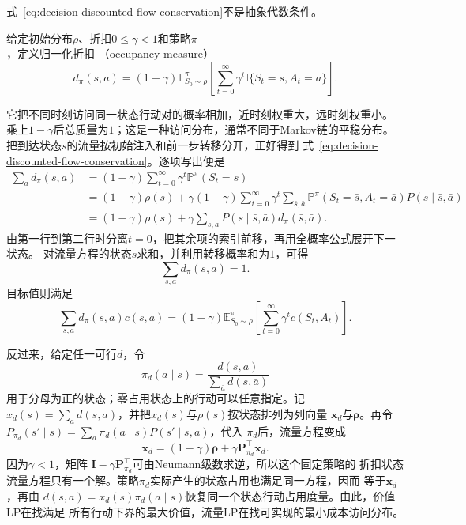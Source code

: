 式~\eqref{eq:decision-discounted-flow-conservation}不是抽象代数条件。
\begin{definition}[归一化折扣占用度量]
\label{def:decision-discounted-occupancy}
给定初始分布$\rho$、折扣$0\leq\gamma<1$和策略\(\pi\)，定义归一化折扣
（occupancy measure）
\begin{equation}
  d_\pi(s,a)
  =
  (1-\gamma)
  \mathbb{E}_{S_0\sim\rho}^{\pi}
  \left[
    \sum_{t=0}^{\infty}
    \gamma^t
    \mathbb{I}\{S_t=s,A_t=a\}
  \right].
  \label{eq:decision-discounted-occupancy}
\end{equation}
\end{definition}
它把不同时刻访问同一状态行动对的概率相加，近时刻权重大，远时刻权重小。
乘上$1-\gamma$后总质量为$1$；这是一种访问分布，通常不同于Markov链的平稳分布。
把到达状态\(s\)的流量按初始注入和前一步转移分开，正好得到
式~\eqref{eq:decision-discounted-flow-conservation}。逐项写出便是
\begin{align*}
  \sum_a d_\pi(s,a)
  &=
  (1-\gamma)\sum_{t=0}^{\infty}
  \gamma^t\mathbb{P}^{\pi}(S_t=s)\\
  &=
  (1-\gamma)\rho(s)
  +
  \gamma(1-\gamma)
  \sum_{t=0}^{\infty}\gamma^t
  \sum_{\bar s,\bar a}
  \mathbb{P}^{\pi}(S_t=\bar s,A_t=\bar a)
  P(s\mid\bar s,\bar a)\\
  &=
  (1-\gamma)\rho(s)
  +
  \gamma\sum_{\bar s,\bar a}
  P(s\mid\bar s,\bar a)d_\pi(\bar s,\bar a).
\end{align*}
由第一行到第二行时分离\(t=0\)，把其余项的索引前移，再用全概率公式展开下一状态。
对流量方程的状态\(s\)求和，并利用转移概率和为\(1\)，可得
\[
  \sum_{s,a}d_\pi(s,a)=1.
\]
目标值则满足
\begin{equation}
  \sum_{s,a}d_\pi(s,a)c(s,a)
  =
  (1-\gamma)
  \mathbb{E}_{S_0\sim\rho}^{\pi}
  \left[
    \sum_{t=0}^{\infty}\gamma^t c(S_t,A_t)
  \right].
  \label{eq:decision-occupancy-cost}
\end{equation}

反过来，给定任一可行\(d\)，令
\[
  \pi_d(a\mid s)
  =
  \frac{d(s,a)}{\sum_{\bar a}d(s,\bar a)}
\]
用于分母为正的状态；零占用状态上的行动可以任意指定。记
\(x_d(s)=\sum_a d(s,a)\)，并把\(x_d(s)\)与\(\rho(s)\)按状态排列为列向量
\(\bm{x}_d\)与\(\bm{\rho}\)。再令
\(P_{\pi_d}(s'\mid s)=\sum_a\pi_d(a\mid s)P(s'\mid s,a)\)，代入
\(\pi_d\)后，流量方程变成
\[
  \bm{x}_d
  =
  (1-\gamma)\bm{\rho}
  +
  \gamma\bm{P}_{\pi_d}^{\top}\bm{x}_d.
\]
因为\(\gamma<1\)，矩阵
\(\bm{I}-\gamma\bm{P}_{\pi_d}^{\top}\)可由Neumann级数求逆，所以这个固定策略的
折扣状态流量方程只有一个解。策略\(\pi_d\)实际产生的状态占用也满足同一方程，因而
等于\(\bm{x}_d\)，再由
\(d(s,a)=x_d(s)\pi_d(a\mid s)\)恢复同一个状态行动占用度量。由此，价值LP在找满足
所有行动下界的最大价值，流量LP在找可实现的最小成本访问分布。

